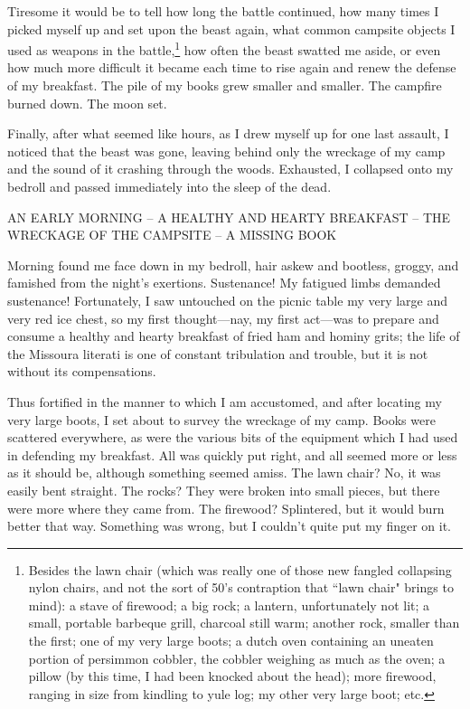 \par
Tiresome it would be to tell how long the battle continued, how many times I picked myself up and set upon the beast again, what common campsite objects I used as weapons in the battle,\footnote{Besides the lawn chair (which was really one of those new fangled collapsing nylon chairs, and not the sort of 50's contraption that ``lawn chair" brings to mind): a stave of firewood; a big rock; a lantern, unfortunately not lit; a small, portable barbeque grill, charcoal still warm; another rock, smaller than the first; one of my very large boots; a dutch oven containing an uneaten portion of persimmon cobbler, the cobbler weighing as much as the oven; a pillow (by this time, I had been knocked about the head); more firewood, ranging in size from kindling to yule log; my other very large boot; etc.} how often the beast swatted me aside, or even how much more difficult it became each time to rise again and renew the defense of my breakfast.  The pile of my books grew smaller and smaller.  The campfire burned down.  The moon set.
\par
Finally, after what seemed like hours, as I drew myself up for one last assault, I noticed that the beast was gone, leaving behind only the wreckage of my camp and the sound of it crashing through the woods.  Exhausted, I collapsed onto my bedroll and passed immediately into the sleep of the dead.
\par
\begin{center}
AN EARLY MORNING – A HEALTHY AND HEARTY BREAKFAST – THE WRECKAGE OF THE CAMPSITE – A MISSING BOOK
\end{center}
\par
Morning found me face down in my bedroll, hair askew and bootless, groggy, and famished from the night's exertions.  Sustenance!  My fatigued limbs demanded sustenance!  Fortunately, I saw untouched on the picnic table my very large and very red ice chest, so my first thought—nay, my first act—was to prepare and consume a healthy and hearty breakfast of fried ham and hominy grits; the life of the Missoura literati is one of constant tribulation and trouble, but it is not without its compensations.
\par
Thus fortified in the manner to which I am accustomed, and after locating my very large boots, I set about to survey the wreckage of my camp.  Books were scattered everywhere, as were the various bits of the equipment which I had used in defending my breakfast.  All was quickly put right, and all seemed more or less as it should be, although something seemed amiss.  The lawn chair?  No, it was easily bent straight.  The rocks?  They were broken into small pieces, but there were more where they came from.  The firewood?  Splintered, but it would burn better that way.  Something was wrong, but I couldn't quite put my finger on it.

